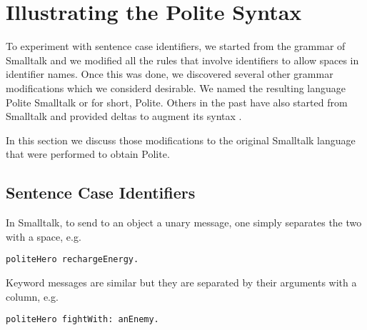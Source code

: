 
\section{Illustrating the Polite Syntax}

To experiment with sentence case identifiers, we started from the grammar of Smalltalk and we modified all the rules that involve identifiers to allow spaces in identifier names. Once this was done, we discovered several other grammar modifications which we considerd desirable. We named the resulting language Polite Smalltalk or for short, Polite. Others in the past have also started from Smalltalk and provided deltas to augment its syntax \cite{Born87}.

In this section we discuss those modifications to the original  Smalltalk language that were performed to obtain Polite.




\newcommand{\comma}{{`,' }}
\newcommand{\plus}{{`+' }}
\newcommand{\code}[1]{{\texttt{#1}}}

\subsection{Sentence Case Identifiers}
In Smalltalk, to send to an object a unary message, one simply separates the two with a space, e.g.

\begin{verbatim} 
politeHero rechargeEnergy.
\end{verbatim}

Keyword messages are similar but they are separated by their arguments with a column, e.g.

\begin{verbatim} 
politeHero fightWith: anEnemy.
\end{verbatim}


